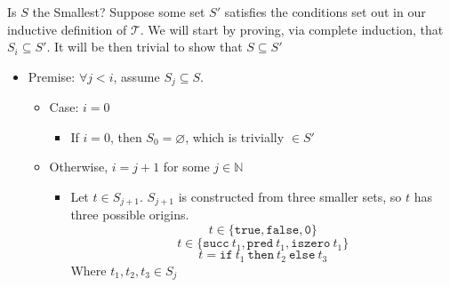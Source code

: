 \documentclass[11pt]{beamer}
\begin{document}
\begin{frame}[fragile=singleslide]{Is $S$ the Smallest?}
Suppose some set $S'$ satisfies the conditions set out in our inductive definition of $\mathcal{T}$.  We will start by proving, via complete induction, that $S_i \subseteq S'$.  It will be then trivial to show that $S \subseteq S'$  
\begin{itemize}
\item Premise: $\forall j < i$, assume $S_j \subseteq S$.  
 \begin{itemize}
 \item Case: $i = 0$
  \begin{itemize}
  \item If $i = 0$, then $S_0 = \varnothing$, which is trivially $\in S'$ 
  \end{itemize}
 \item Otherwise, $i = j+1$ for some $j \in \mathbb{N}$
  \begin{itemize}
  \item Let $t \in S_{j+1}$. $S_{j+1}$ is constructed from three smaller sets, so $t$ has three possible origins.
\begin{equation}
t \in \{\texttt{true}, \texttt{false}, \texttt{0}\}
\end{equation}
\begin{equation}
t \in \{\texttt{succ}\: t_1, \texttt{pred}\: t_1, \texttt{iszero}\: t_1\}
\end{equation} 
\begin{equation}
t = \texttt{if}\: t_1 \:\texttt{then}\: t_2 \:\texttt{else}\: t_3 
\end{equation}
  Where $t_1,t_2, t_3 \in S_j$
  \end{itemize}
 \end{itemize}
\end{itemize}
\end{frame}
\end{document}
